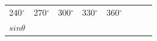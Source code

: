 \begin{center}
\begin{xtabular*}{\mytablewidth}[t]{|p{10\mystarwidth}|p{10\mystarwidth}|p{10\mystarwidth}|p{10\mystarwidth}|p{10\mystarwidth}|p{10\mystarwidth}|p{10\mystarwidth}|p{10\mystarwidth}|}
        240${}^{\circ }$ &
        270${}^{\circ }$ &
        300${}^{\circ }$ &
        330${}^{\circ }$ &
        360${}^{\circ }$%
     \tabularnewline{}
                  $sin\theta $
                 &
         &
         &
         &
         &
         &
         &

\end{xtabular*}
\end{center}
